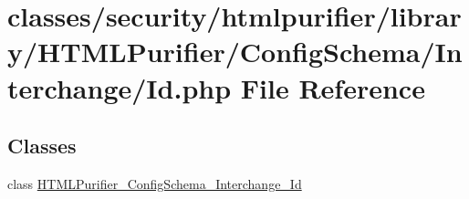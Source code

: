\hypertarget{ConfigSchema_2Interchange_2ID_8php}{\section{classes/security/htmlpurifier/library/\+H\+T\+M\+L\+Purifier/\+Config\+Schema/\+Interchange/\+Id.php File Reference}
\label{ConfigSchema_2Interchange_2ID_8php}
}
\subsection*{Classes}
\begin{DoxyCompactItemize}
\item 
class \hyperlink{classHTMLPurifier__ConfigSchema__Interchange__Id}{H\+T\+M\+L\+Purifier\+\_\+\+Config\+Schema\+\_\+\+Interchange\+\_\+\+Id}
\end{DoxyCompactItemize}

